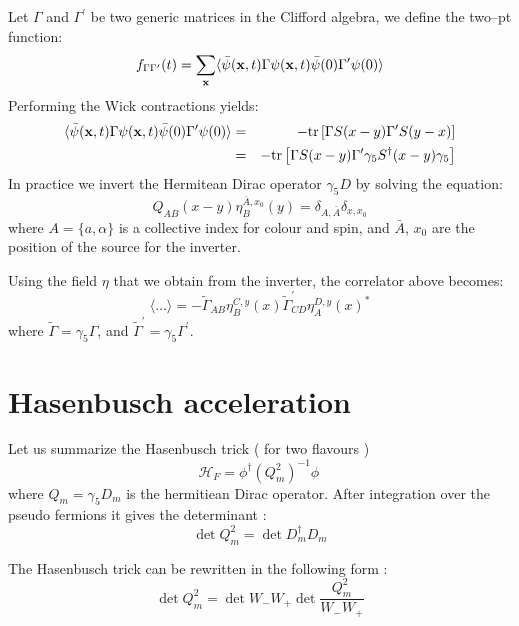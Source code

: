 \documentclass{article}[12pt]
\def\bfx{{\bf x}}
\begin{document}
\noindent
Let $\Gamma$ and $\Gamma^\prime$ be two generic matrices in the
Clifford algebra, we define the two--pt function:
%
\begin{equation}
f_{\Gamma\Gamma^\prime}(t) = \sum_\bfx \langle \bar\psi(\bfx,t) \Gamma
\psi(\bfx,t) \bar\psi(0) \Gamma^\prime \psi(0) \rangle
\end{equation}
%
Performing the Wick contractions yields:
%
\begin{eqnarray}
\langle \bar\psi(\bfx,t) \Gamma
\psi(\bfx,t) \bar\psi(0) \Gamma^\prime \psi(0) \rangle &=&
- \mathrm{tr} \left[ \Gamma S(x-y) \Gamma^\prime S(y-x) \right]
\nonumber \\
&=& - \mathrm{tr} \left[ \Gamma S(x-y) \Gamma^\prime \gamma_5
S^\dagger(x-y) \gamma_5 \right] \nonumber
\end{eqnarray}
%
In practice we invert the Hermitean Dirac operator $\gamma_5 D$ by
solving the equation:
%
\begin{equation}
Q_{AB}(x-y) \eta^{\bar A,x_0}_B(y) = \delta_{A,\bar A} \delta_{x,x_0}
\end{equation}
%
where $A=\{a,\alpha\}$ is a collective index for colour and spin, and
$\bar A$, $x_0$ are the position of the source for the inverter.

Using the field $\eta$ that we obtain from the inverter, the
correlator above becomes:
%
\begin{equation}
\langle \ldots \rangle = - \tilde \Gamma_{AB} \eta^{C,y}_B(x)
\tilde \Gamma^\prime_{CD} \eta^{D,y}_A(x)^*
\end{equation}
where $\tilde \Gamma= \gamma_5 \Gamma$, and $\tilde \Gamma^\prime =
\gamma_5 \Gamma^\prime$.

\section{Hasenbusch acceleration}


Let us summarize the Hasenbusch trick ( for two flavours )
\begin{equation}
\mathcal{H}_F = \phi^\dagger ( Q_m^2 )^{-1} \phi \,
\end{equation}
where $Q_m =\gamma_5 D_m$ is the hermitiean Dirac operator.
After integration over the pseudo fermions it gives the determinant :
\begin{equation}
\det{ Q_m ^2 } = \det{D_m^{\dagger} D_m}
\end{equation}

The Hasenbusch trick can be rewritten in the following form :
\begin{equation}
\det{ Q_m ^2 }  = \det{W_- W_+} \det{\frac{ Q_m^2}{W_- W_+}}
\end{equation}
\end{document}
